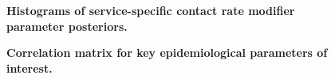 \begin{figure}[ht]
    \caption{\textbf{Histograms of service-specific contact rate modifier parameter posteriors.}}
\end{figure}

\begin{figure}[ht]
    \caption{\textbf{Correlation matrix for key epidemiological parameters of interest.}}
\end{figure}

